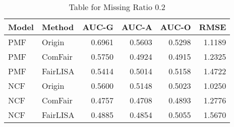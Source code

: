 \begin{table}
\centering
\caption{Table for Missing Ratio 0.2}
\label{tab:missing_0.2}
\begin{tabular}{llrrrr}
\toprule
Model &   Method &  AUC-G &  AUC-A &  AUC-O &   RMSE \\
\midrule
  PMF &   Origin & 0.6961 & 0.5603 & 0.5298 & 1.1189 \\
  PMF &  ComFair & 0.5750 & 0.4924 & 0.4915 & 1.2325 \\
  PMF & FairLISA & 0.5414 & 0.5014 & 0.5158 & 1.4722 \\
  NCF &   Origin & 0.5600 & 0.5148 & 0.5023 & 1.0250 \\
  NCF &  ComFair & 0.4757 & 0.4708 & 0.4893 & 1.2776 \\
  NCF & FairLISA & 0.4885 & 0.4854 & 0.5055 & 1.5670 \\
\bottomrule
\end{tabular}
\end{table}
